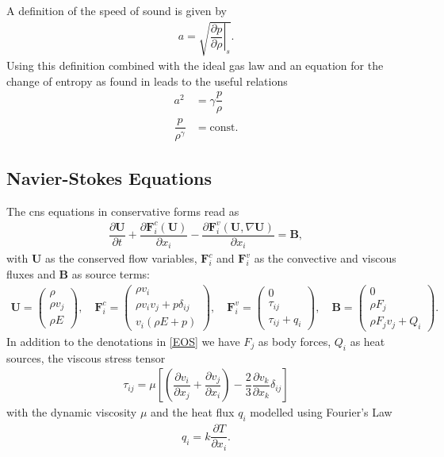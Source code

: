 		A definition of the speed of sound is given by
		\begin{align}
			a = \sqrt{\left.\dfrac{\partial p}{\partial \rho}\right|_s}.
		\end{align}
		Using this definition combined with the ideal gas law and an equation for the change of entropy as found in \cite{mueller2014} leads to the useful relations 
		\begin{align}
			a^2 &= \gamma \dfrac{p}{\rho}\\
			\dfrac{p}{\rho^\gamma} &= \text{const}.
		\end{align}
		
		
		\subsection{Navier-Stokes Equations}
		The \gls{cns} equations in conservative forms read as 
		\begin{align}
			\dfrac{\partial \mathbf{U}}{\partial t} + \dfrac{\partial \mathbf{F}_i^c(\mathbf{U})}{\partial x_i} - \dfrac{\partial \mathbf{F}_i^v(\mathbf{U}, \nabla\mathbf{U})}{\partial x_i} = \mathbf{B},
		\end{align}
		with $\mathbf{U}$ as the conserved flow variables, $\mathbf{F}_i^c$ and $\mathbf{F}_i^v$ as the convective and viscous fluxes and $\mathbf{B}$ as source terms:
		\begin{align}
			\mathbf{U} = 
				\begin{pmatrix}
				\rho \\
				\rho v_j \\
				\rho E
				\end{pmatrix} , \quad
			\mathbf{F}_i^c = 
				\begin{pmatrix}
				\rho v_i \\
				\rho v_i v_j + p \delta_{ij}\\
				v_i(\rho E + p)
				\end{pmatrix} , \quad
			\mathbf{F}_i^v = 
				\begin{pmatrix}
				0 \\
				\tau_{ij}\\
				\tau_{ij} + q_i
				\end{pmatrix} , \quad
			\mathbf{B} = 
				\begin{pmatrix}
				0 \\
				\rho F_j\\
				\rho F_j v_j + Q_i
				\end{pmatrix}.
		\end{align}
		In addition to the denotations in \cref{EOS} we have $F_j$ as body forces, $Q_i$ as heat sources, the viscous stress tensor
		\begin{align}
			\tau_{ij} = \mu \left[\left(\dfrac{\partial v_i}{\partial x_j} + \dfrac{\partial v_j}{\partial x_i} \right) - \dfrac{2}{3} \dfrac{\partial v_k}{\partial x_k} \delta_{ij}\right]
		\end{align}
		with the dynamic viscosity $\mu$ and the heat flux $q_i$ modelled using Fourier's Law
		\begin{align}
			q_i = k \dfrac{\partial T}{\partial x_i}.
		\end{align}
		
